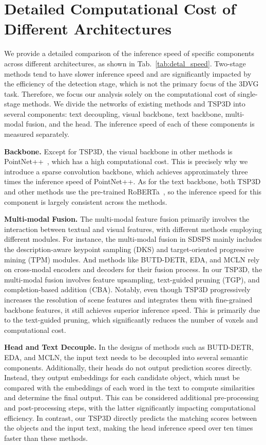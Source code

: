 \section{Detailed Computational Cost of Different Architectures}\label{sec:supp2}
We provide a detailed comparison of the inference speed of specific components across different architectures, as shown in Tab.~\ref{tab:detal_speed}. Two-stage methods tend to have slower inference speed and are significantly impacted by the efficiency of the detection stage, which is not the primary focus of the 3DVG task. Therefore, we focus our analysis solely on the computational cost of single-stage methods.
We divide the networks of existing methods and TSP3D into several components: text decoupling, visual backbone, text backbone, multi-modal fusion, and the head. The inference speed of each of these components is measured separately.


\textbf{Backbone.} Except for TSP3D, the visual backbone in other methods is PointNet++~\citep{qi2017pointnetpp}, which has a high computational cost. This is precisely why we introduce a sparse convolution backbone, which achieves approximately three times the inference speed of PointNet++. As for the text backbone, both TSP3D and other methods use the pre-trained RoBERTa~\citep{liu2019roberta}, so the inference speed for this component is largely consistent across the methods.

\textbf{Multi-modal Fusion.} The multi-modal feature fusion primarily involves the interaction between textual and visual features, with different methods employing different modules. For instance, the multi-modal fusion in SDSPS mainly includes the description-aware keypoint sampling (DKS) and target-oriented progressive mining (TPM) modules. And methods like BUTD-DETR, EDA, and MCLN rely on cross-modal encoders and decoders for their fusion process.
In our TSP3D, the multi-modal fusion involves feature upsampling, text-guided pruning (TGP), and completion-based addition (CBA). Notably, even though TSP3D progressively increases the resolution of scene features and integrates them with fine-grained backbone features, it still achieves superior inference speed. This is primarily due to the text-guided pruning, which significantly reduces the number of voxels and computational cost.

\textbf{Head and Text Decouple.} In the designs of methods such as BUTD-DETR, EDA, and MCLN, the input text needs to be decoupled into several semantic components. 
Additionally, their heads do not output prediction scores directly. Instead, they output embeddings for each candidate object, which must be compared with the embeddings of each word in the text to compute similarities and determine the final output.
This can be considered additional pre-processing and post-processing steps, with the latter significantly impacting computational efficiency.
In contrast, our TSP3D directly predicts the matching scores between the objects and the input text, making the head inference speed over ten times faster than these methods.

